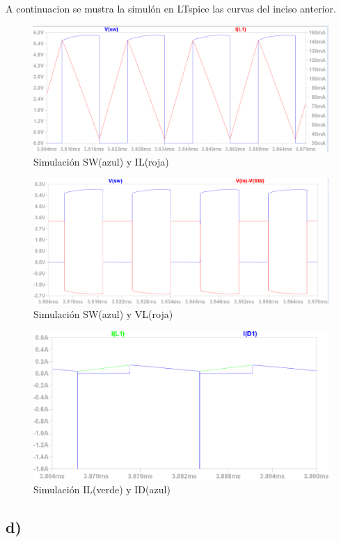 \documentclass[e4_tp1_main.tex]{subfiles}
\begin{document}
A continuacion se mustra la simul\'on en LTspice las curvas del inciso anterior. 

\begin{figure}[H]
  \centering
    \includegraphics[scale = 0.4]{Imagenes/punto2/SW&IL}
  \caption{Simulaci\'on SW(azul) y IL(roja)}
  \label{fig:SW&IL}
\end{figure}


\begin{figure}[H]
  \centering
    \includegraphics[scale = 0.4]{Imagenes/punto2/SW&VL}
  \caption{Simulaci\'on SW(azul) y VL(roja)}
  \label{fig:SW&VL}
\end{figure}


\begin{figure}[H]
  \centering
    \includegraphics[scale = 0.52]{Imagenes/punto2/IL&ID}
  \caption{Simulaci\'on IL(verde) y ID(azul)}
  \label{fig:IL&ID}
\end{figure}


\subsection*{d)}





\newpage
\end{document}
